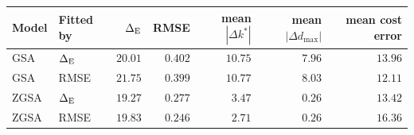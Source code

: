 \begin{tabular}{@{}llrrrrr@{}}
  \toprule
  Model & Fitted by & $\Delta_{\rm E}$ & RMSE & mean $|\Delta k^*|$ & mean $|\Delta d_{\max}|$ & mean cost error \\
  \midrule
  GSA & $\Delta_{\rm E}$ & $20.01$ & $0.402$ & $10.75$ & $7.96$ & $13.96$ \\
  GSA & RMSE & $21.75$ & $0.399$ & $10.77$ & $8.03$ & $12.11$ \\
  ZGSA & $\Delta_{\rm E}$ & $19.27$ & $0.277$ & $3.47$ & $0.26$ & $13.42$ \\
  ZGSA & RMSE & $19.83$ & $0.246$ & $2.71$ & $0.26$ & $16.36$ \\
  \bottomrule
\end{tabular}

